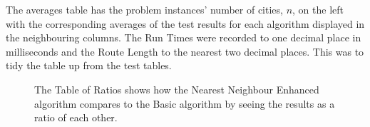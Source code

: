 \documentclass[conference,backref=page]{acmsiggraph}
\begin{document}
The averages table has the problem instances' number of cities, $n$, on the left with the corresponding averages of the test results for each algorithm displayed in the neighbouring columns. The Run Times were recorded to one decimal place in milliseconds and the Route Length to the nearest two decimal places. This was to tidy the table up from the test tables.

\begin{figure}[H]
	\begin{center}
		\caption{The Table of Ratios shows how the Nearest Neighbour Enhanced algorithm compares to the Basic algorithm by seeing the results as a ratio of each other.}
		\label{ratioresultstable}
	\end{center}
\end{figure}
\end{document}
